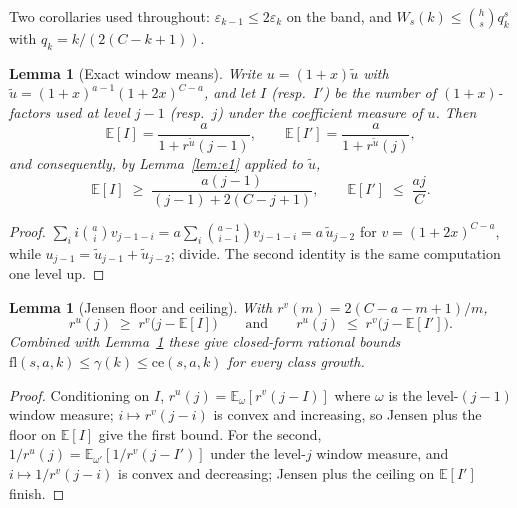 \documentclass[11pt]{article}
\newtheorem{lemma}[theorem]{Lemma}
\theoremstyle{definition}
\newcommand{\eps}{\varepsilon}
\begin{document}
Two corollaries used throughout: $\eps_{k-1}\le2\eps_k$ on the band,
and $W_s(k)\le\binom hs q_k^s$ with $q_k=k/(2(C-k+1))$.

\begin{lemma}[Exact window means]\label{lem:means}
Write $u=(1+x)\tilde u$ with $\tilde u=(1+x)^{a-1}(1+2x)^{C-a}$, and
let $I$ (resp.\ $I'$) be the number of $(1+x)$-factors used at level
$j-1$ (resp.\ $j$) under the coefficient measure of $u$.  Then
\[
  \mathbb E[I]=\frac{a}{1+r^{\tilde u}(j-1)},\qquad
  \mathbb E[I']=\frac{a}{1+r^{\tilde u}(j)},
\]
and consequently, by Lemma~\ref{lem:e1} applied to $\tilde u$,
\[
  \mathbb E[I]\;\ge\;\frac{a(j-1)}{(j-1)+2(C-j+1)},\qquad
  \mathbb E[I']\;\le\;\frac{aj}{C}.
\]
\end{lemma}

\begin{proof}
$\sum_i i\binom ai v_{j-1-i}=a\sum_i\binom{a-1}{i-1}v_{j-1-i}
=a\,\tilde u_{j-2}$ for $v=(1+2x)^{C-a}$, while
$u_{j-1}=\tilde u_{j-1}+\tilde u_{j-2}$; divide.  The second identity
is the same computation one level up.
\end{proof}

\begin{lemma}[Jensen floor and ceiling]\label{lem:jensen}
With $r^v(m)=2(C-a-m+1)/m$,
\[
  r^u(j)\;\ge\;r^v\!\bigl(j-\mathbb E[I]\bigr)
  \qquad\text{and}\qquad
  r^u(j)\;\le\;r^v\!\bigl(j-\mathbb E[I']\bigr).
\]
Combined with Lemma~\ref{lem:means} these give closed-form rational
bounds $\mathrm{fl}(s,a,k)\le\gamma(k)\le\mathrm{ce}(s,a,k)$ for every
class growth.
\end{lemma}

\begin{proof}
Conditioning on $I$, $r^u(j)=\mathbb E_\omega[r^v(j-I)]$ where
$\omega$ is the level-$(j-1)$ window measure; $i\mapsto r^v(j-i)$ is
convex and increasing, so Jensen plus the floor on $\mathbb E[I]$ give
the first bound.  For the second, $1/r^u(j)=\mathbb
E_{\omega'}[1/r^v(j-I')]$ under the level-$j$ window measure, and
$i\mapsto 1/r^v(j-i)$ is convex and decreasing; Jensen plus the
ceiling on $\mathbb E[I']$ finish.
\end{proof}
\end{document}

